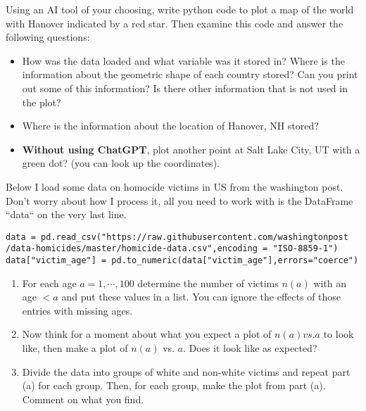 \begin{exercise}
Using an AI tool of your choosing, write python code to plot a map of the world with Hanover indicated by a red star. 
 Then examine this code and answer the following questions: 
 \begin{itemize}
 \item How was the data loaded and what variable was it stored in?  Where is the information about the geometric shape of each country stored? Can you print out some of this information? Is there other information that is not used in the plot? 
 \item Where is the information about the location of Hanover, NH stored? 
 \item {\bf Without using ChatGPT}, plot another point at Salt Lake City, UT with a green dot? (you can look up the coordinates). 
 \end{itemize}
 
 \end{exercise}





\begin{exercise}\label{ex:washpost}
Below I load some data on homocide victims in US from the washington post. Don't worry about how I process it, all you need to work with is the DataFrame ``data`` on the very last line.

\begin{Verbatim}
data = pd.read_csv("https://raw.githubusercontent.com/washingtonpost
/data-homicides/master/homicide-data.csv",encoding = "ISO-8859-1")
data["victim_age"] = pd.to_numeric(data["victim_age"],errors="coerce")
\end{Verbatim}
%

\begin{enumerate}[label=(\alph*)]
\item  For each age $a = 1,\cdots,100$ determine the number of victims $n(a)$ with an age $<a$ and put these values in a list. You can ignore the effects of those entries with missing ages. 
\item Now think for a moment about what you expect a plot of $n(a) vs. a$ to look like, then make a plot of $n(a)$ vs. $a$. Does it look like as expected?
\item Divide the data into groups of white and non-white victims and repeat part (a) for each group. Then, for each group, make the plot from part (a). Comment on what you find. 
\end{enumerate}
\end{exercise}



